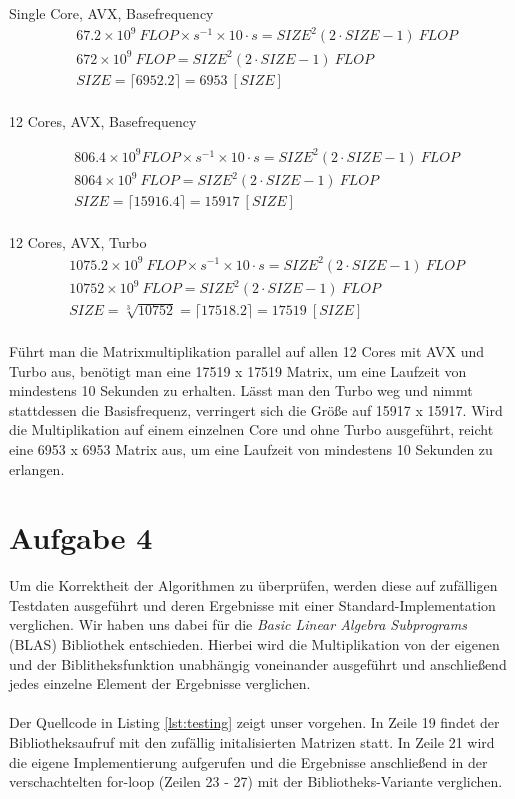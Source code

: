 \documentclass[a4paper]{article}
\begin{document}
Single Core, AVX, Basefrequency \\
\begin{align*}
    & 67.2 \times 10^{9}~FLOP \times s^{-1} \times 10\cdot s = SIZE^{2} (2\cdot SIZE - 1)~FLOP \\
    & 672 \times 10^{9}~FLOP = SIZE^{2} (2\cdot SIZE - 1)~FLOP \\
    & SIZE = \lceil 6952.2 \rceil = 6953~[SIZE] \\
\end{align*}

12 Cores, AVX, Basefrequency

\begin{align*}
    & 806.4 \times 10^{9}FLOP \times s^{-1} \times 10\cdot s = SIZE^{2} (2\cdot SIZE - 1)~FLOP \\
    & 8064 \times 10^{9}~FLOP = SIZE^{2} (2\cdot SIZE - 1)~FLOP \\
    & SIZE = \lceil 15916.4 \rceil = 15917~[SIZE] \\
\end{align*}

12 Cores, AVX, Turbo \\
\begin{align*}
    & 1075.2 \times 10^{9}~FLOP \times s^{-1} \times 10\cdot s = SIZE^{2} (2\cdot SIZE - 1)~FLOP \\
    & 10752 \times 10^{9}~FLOP = SIZE^{2} (2\cdot SIZE - 1)~FLOP \\
    & SIZE = \sqrt[3]{10752} = \lceil 17518.2 \rceil = 17519~[SIZE] \\
\end{align*}

Führt man die Matrixmultiplikation parallel auf allen 12 Cores mit AVX und Turbo aus, benötigt man eine 17519 x 17519 Matrix, um eine Laufzeit von mindestens 10 Sekunden zu erhalten. Lässt man den Turbo weg und nimmt stattdessen die Basisfrequenz, verringert sich die Größe auf 15917 x 15917. Wird die Multiplikation auf einem einzelnen Core und ohne Turbo ausgeführt, reicht eine 6953 x 6953 Matrix aus, um eine Laufzeit von mindestens 10 Sekunden zu erlangen. 


\section*{Aufgabe 4}
Um die Korrektheit der Algorithmen zu überprüfen, werden diese auf zufälligen Testdaten ausgeführt und deren Ergebnisse mit einer Standard-Implementation verglichen. Wir haben uns dabei für die \textit{Basic Linear Algebra Subprograms} (BLAS) Bibliothek entschieden. Hierbei wird die Multiplikation von der eigenen und der Biblitheksfunktion unabhängig voneinander ausgeführt und anschließend jedes einzelne Element der Ergebnisse verglichen.
\\\\
Der Quellcode in Listing \ref{lst:testing} zeigt unser vorgehen. In Zeile 19 findet der Bibliotheksaufruf mit den zufällig initalisierten Matrizen statt. In Zeile 21 wird die eigene Implementierung aufgerufen und die Ergebnisse anschließend in der verschachtelten for-loop (Zeilen 23 - 27) mit der Bibliotheks-Variante verglichen.
\end{document}
